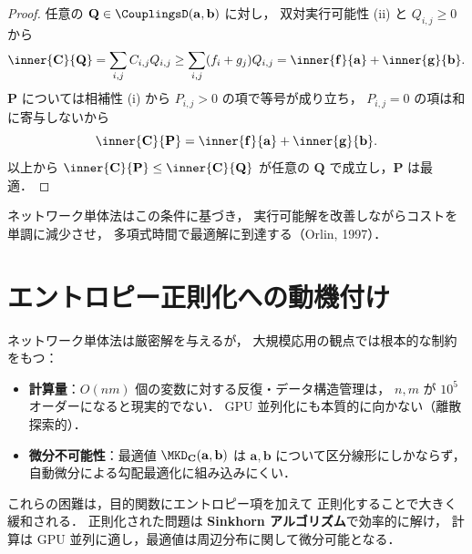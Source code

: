 \begin{proof}
  任意の $\mathbf{Q} \in \CouplingsD(\mathbf{a}, \mathbf{b})$ に対し，
  双対実行可能性 (ii) と $Q_{i,j} \geq 0$ から
  \[
    \inner{\mathbf{C}}{\mathbf{Q}}
    = \sum_{i,j} C_{i,j} Q_{i,j}
    \geq \sum_{i,j} (f_i + g_j) Q_{i,j}
    = \inner{\mathbf{f}}{\mathbf{a}} + \inner{\mathbf{g}}{\mathbf{b}}.
  \]
  $\mathbf{P}$ については相補性 (i) から $P_{i,j} > 0$ の項で等号が成り立ち，
  $P_{i,j} = 0$ の項は和に寄与しないから
  \[
    \inner{\mathbf{C}}{\mathbf{P}}
    = \inner{\mathbf{f}}{\mathbf{a}} + \inner{\mathbf{g}}{\mathbf{b}}.
  \]
  以上から
  $\inner{\mathbf{C}}{\mathbf{P}} \leq \inner{\mathbf{C}}{\mathbf{Q}}$
  が任意の $\mathbf{Q}$ で成立し，$\mathbf{P}$ は最適．
\end{proof}

ネットワーク単体法はこの条件に基づき，
実行可能解を改善しながらコストを単調に減少させ，
多項式時間で最適解に到達する（Orlin, 1997）．

\section{エントロピー正則化への動機付け}
\label{sec:sem-motivation-entropic}

ネットワーク単体法は厳密解を与えるが，
大規模応用の観点では根本的な制約をもつ：

\begin{itemize}
  \item \textbf{計算量}：$O(nm)$ 個の変数に対する反復・データ構造管理は，
    $n, m$ が $10^5$ オーダーになると現実的でない．
    GPU 並列化にも本質的に向かない（離散探索的）．
  \item \textbf{微分不可能性}：最適値 $\MKD_{\mathbf{C}}(\mathbf{a}, \mathbf{b})$ は
    $\mathbf{a}, \mathbf{b}$ について区分線形にしかならず，
    自動微分による勾配最適化に組み込みにくい．
\end{itemize}

これらの困難は，目的関数にエントロピー項を加えて
正則化することで大きく緩和される．
正則化された問題は \textbf{Sinkhorn アルゴリズム}で効率的に解け，
計算は GPU 並列に適し，最適値は周辺分布に関して微分可能となる．
